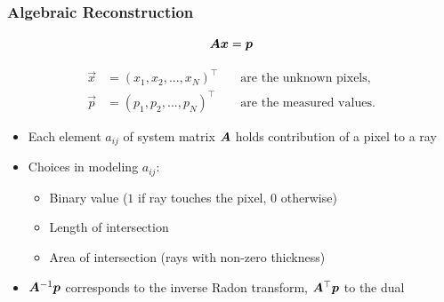 \begin{frame}
	\frametitle{Algebraic Reconstruction}

	\begin{equation}
		\label{eqn:ct_algebraic_1}
		\bm A\boldsymbol{x} = \boldsymbol{p}
	\end{equation}

	\begin{eqnarray*}
		\vec{x} &= (x_1, x_2,...,x_N)^\top &\quad \text{are the unknown pixels,} \\
		\vec{p} &= (p_1, p_2,...,p_N)^\top &\quad \text{are the measured values.}
	\end{eqnarray*}

	\begin{itemize}
		\item Each element $a_{ij}$ of system matrix $\bm A$ holds contribution of a pixel to a ray
		\item Choices in modeling $a_{ij}$:
		      \begin{itemize}
			      \item Binary value ($1$ if ray touches the pixel, $0$ otherwise)
			      \item Length of intersection
			      \item Area of intersection (rays with non-zero thickness)
		      \end{itemize}
		\item $\bm A^{-1} \boldsymbol{p}$ corresponds to the inverse Radon transform, $\bm A^\top \boldsymbol{p}$ to the dual
	\end{itemize}

\end{frame}

